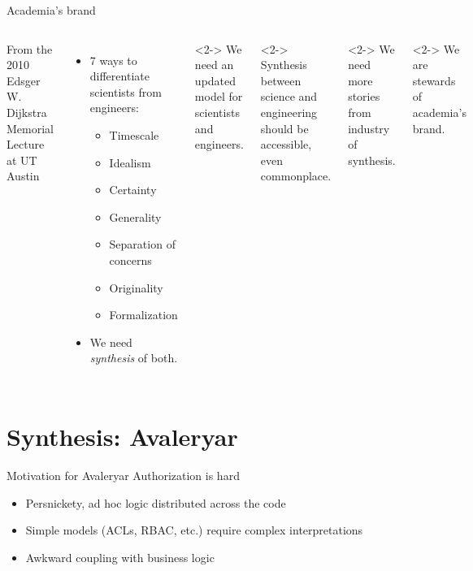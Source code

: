 \documentclass[aspectratio=169,ignorenonframetext]{beamer}
\begin{document}
\begin{frame}{Academia's brand}
	\begin{columns}
		From the 2010 Edsger W. Dijkstra Memorial Lecture at UT Austin
		\begin{itemize}
			\item 7 ways to differentiate scientists from engineers:
			      \begin{multicols}{2}
				      \begin{itemize}
					      \item Timescale
					      \item Idealism
					      \item Certainty
					      \item Generality
					      \item Separation of concerns
					      \item Originality
					      \item Formalization
				      \end{itemize}
			      \end{multicols}
			\item We need \emph{synthesis} of both.
		\end{itemize}
		\begin{exampleblock}<2->{}
			We need an updated model for scientists and engineers.
		\end{exampleblock}
		\begin{exampleblock}<2->{}
			Synthesis between science and engineering should be accessible, even commonplace.
		\end{exampleblock}
		\begin{exampleblock}<2->{}
			We need more stories from industry of synthesis.
		\end{exampleblock}
		\begin{exampleblock}<2->{}
			We are stewards of academia's brand.
		\end{exampleblock}
	\end{columns}
\end{frame}

\section{Synthesis: Avaleryar}

\begin{frame}{Motivation for Avaleryar}
	Authorization is hard
	\begin{itemize}
		\item Persnickety, ad hoc logic distributed across the code
		\item Simple models (ACLs, RBAC, etc.) require complex interpretations
		\item Awkward coupling with business logic
	\end{itemize}
\end{frame}
\end{document}
